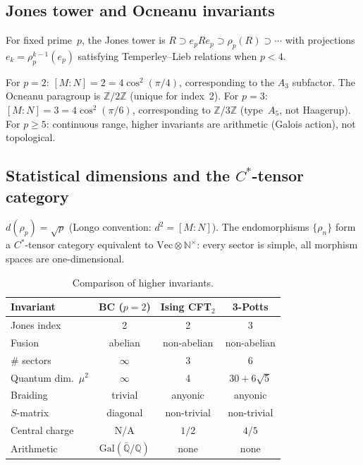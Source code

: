 \documentclass[aps,prl,twocolumn,superscriptaddress,showpacs]{revtex4-2}
\begin{document}
\subsection{Jones tower and Ocneanu invariants}

For fixed prime~$p$, the Jones tower is $R \supset e_p R e_p \supset \rho_p(R) \supset \cdots$ with projections $e_k = \rho_p^{k-1}(e_p)$ satisfying Temperley--Lieb relations when $p < 4$.

For $p=2$: $[M{:}N]=2 = 4\cos^2(\pi/4)$, corresponding to the $A_3$ subfactor. The Ocneanu paragroup is $\mathbb{Z}/2\mathbb{Z}$ (unique for index~2). For $p=3$: $[M{:}N]=3 = 4\cos^2(\pi/6)$, corresponding to $\mathbb{Z}/3\mathbb{Z}$ (type~$A_5$, not Haagerup). For $p \geq 5$: continuous range, higher invariants are arithmetic (Galois action), not topological.

\subsection{Statistical dimensions and the $C^*$-tensor category}

$d(\rho_p) = \sqrt{p}$ (Longo convention: $d^2 = [M{:}N]$). The endomorphisms $\{\rho_n\}$ form a $C^*$-tensor category equivalent to $\mathrm{Vec} \otimes \mathbb{N}^\times$: every sector is simple, all morphism spaces are one-dimensional.

\begin{table}[b]
\caption{Comparison of higher invariants.}
\label{tab:invariants}
\begin{ruledtabular}
\begin{tabular}{lccc}
Invariant & BC ($p=2$) & Ising CFT$_2$ & 3-Potts \\
\hline
Jones index & 2 & 2 & 3 \\
Fusion & abelian & non-abelian & non-abelian \\
\# sectors & $\infty$ & 3 & 6 \\
Quantum dim.\ $\mu^2$ & $\infty$ & 4 & $30{+}6\sqrt{5}$ \\
Braiding & trivial & anyonic & anyonic \\
$S$-matrix & diagonal & non-trivial & non-trivial \\
Central charge & N/A & $1/2$ & $4/5$ \\
Arithmetic & $\mathrm{Gal}(\bar{\mathbb{Q}}/\mathbb{Q})$ & none & none \\
\end{tabular}
\end{ruledtabular}
\end{table}
\end{document}
